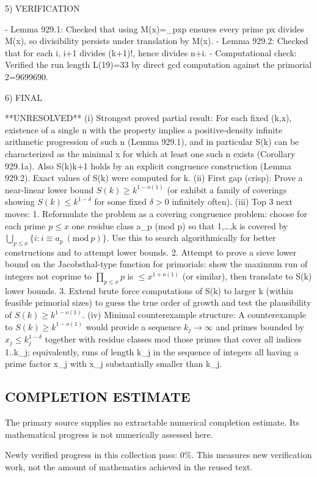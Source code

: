 5) VERIFICATION

- Lemma 929.1: Checked that using M(x)=\prod_{p\le x}p ensures every prime p\le x divides M(x), so divisibility persists under translation by M(x).
- Lemma 929.2: Checked that for each i, i+1 divides (k+1)!, hence divides n+i.
- Computational check: Verified the run length L(19)=33 by direct gcd computation against the primorial 2=9699690.


6) FINAL

**UNRESOLVED**
(i) Strongest proved partial result: For each fixed (k,x), existence of a single n with the property implies a positive-density infinite arithmetic progression of such n (Lemma 929.1), and in particular S(k) can be characterized as the minimal x for which at least one such n exists (Corollary 929.1a). Also S(k)\le k+1 holds by an explicit congruence construction (Lemma 929.2). Exact values of S(k) were computed for k.
(ii) First gap (crisp): Prove a near-linear lower bound \(S(k)\ge k^{1-o(1)}\) (or exhibit a family of coverings showing \(S(k)\le k^{1-\delta}\) for some fixed \(\delta>0\) infinitely often).
(iii) Top 3 next moves:
  1. Reformulate the problem as a covering congruence problem: choose for each prime \(p\le x\) one residue class a_p (mod p) so that {1,\dots,k} is covered by \(\bigcup_{p\le x}\{i: i\equiv a_p\ (\mathrm{mod}\ p)\}\). Use this to search algorithmically for better constructions and to attempt lower bounds.
  2. Attempt to prove a sieve lower bound on the Jacobsthal-type function for primorials: show the maximum run of integers not coprime to \(\prod_{p\le x} p\) is \(\le x^{1+o(1)}\) (or similar), then translate to S(k) lower bounds.
  3. Extend brute force computations of S(k) to larger k (within feasible primorial sizes) to guess the true order of growth and test the plausibility of \(S(k)\ge k^{1-o(1)}\).
(iv) Minimal counterexample structure: A counterexample to \(S(k)\ge k^{1-o(1)}\) would provide a sequence \(k_j\to\infty\) and primes bounded by \(x_j\le k_j^{1-\delta}\) together with residue classes mod those primes that cover all indices 1..k_j; equivalently, runs of length k_j in the sequence of integers all having a prime factor \le x_j with x_j substantially smaller than k_j.


\subsection*{COMPLETION ESTIMATE}
The primary source supplies no extractable numerical completion estimate. Its mathematical progress is not numerically assessed here.

Newly verified progress in this collection pass: $0\%$. This measures new verification work, not the amount of mathematics achieved in the reused text.
